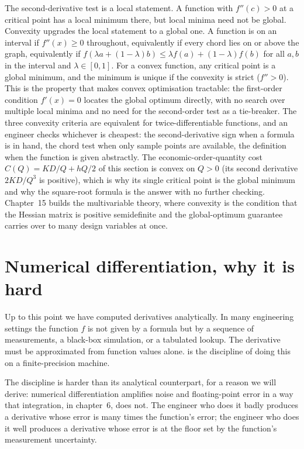 \begin{mastery}
The second-derivative test is a local statement. A function with
$f''(c) > 0$ at a critical point has a local minimum there, but
local minima need not be global. Convexity upgrades the local
statement to a global one. A function is  on an
interval if $f''(x) \geq 0$ throughout, equivalently if every chord
lies on or above the graph, equivalently if $f(\lambda a + (1 -
\lambda) b) \leq \lambda f(a) + (1 - \lambda) f(b)$ for all $a, b$
in the interval and $\lambda \in [0, 1]$. For a convex function, any
critical point is a global minimum, and the minimum is unique if the
convexity is strict ($f'' > 0$). This is the property that makes
convex optimisation tractable: the first-order condition $f'(x) = 0$
locates the global optimum directly, with no search over multiple
local minima and no need for the second-order test as a tie-breaker.
The three convexity criteria are equivalent for twice-differentiable
functions, and an engineer checks whichever is cheapest: the
second-derivative sign when a formula is in hand, the chord test
when only sample points are available, the definition when the
function is given abstractly. The economic-order-quantity cost
$C(Q) = KD/Q + hQ/2$ of this section is convex on $Q > 0$ (its
second derivative $2KD/Q^{3}$ is positive), which is why its single
critical point is the global minimum and why the square-root formula
is the answer with no further checking. Chapter~15 builds the
multivariable theory, where convexity is the condition that the
Hessian matrix is positive semidefinite and the global-optimum
guarantee carries over to many design variables at once.
\end{mastery}

\section{Numerical differentiation, why it is hard}

Up to this point we have computed derivatives analytically. In
many engineering settings the function $f$ is not given by a
formula but by a sequence of measurements, a black-box simulation,
or a tabulated lookup. The derivative must be approximated from
function values alone.  is the
discipline of doing this on a finite-precision machine.

The discipline is harder than its analytical counterpart, for a
reason we will derive: numerical differentiation amplifies noise
and floating-point error in a way that integration, in
chapter~6, does not. The engineer who does it badly produces a
derivative whose error is many times the function's error; the
engineer who does it well produces a derivative whose error is at
the floor set by the function's measurement uncertainty.

